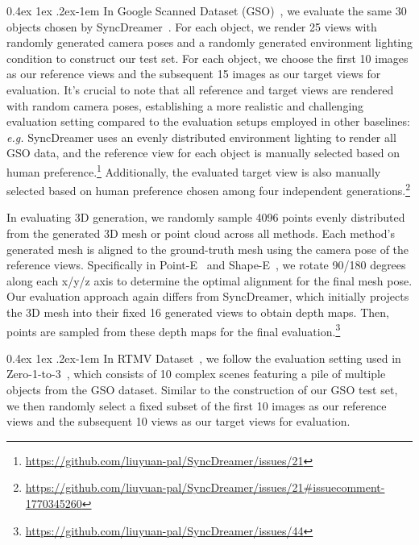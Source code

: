 \documentclass[10pt,twocolumn,letterpaper]{article}
\makeatletter
\renewcommand{\paragraph}{%
  \@startsection{paragraph}{4}%
  {\z@}{0.4ex \@plus 1ex \@minus .2ex}{-1em}%
  {\normalfont\normalsize\bfseries}%
}
\makeatother
\begin{document}
\paragraph{In Google Scanned Dataset (GSO)~\cite{downs2022google},} we evaluate the same 30 objects chosen by SyncDreamer~\cite{liu2023syncdreamer}. For each object, we render 25 views with randomly generated camera poses and a randomly generated environment lighting condition to construct our test set. For each object, we choose the first 10 images as our reference views and the subsequent 15 images as our target views for evaluation. It's crucial to note that all reference and target views are rendered with random camera poses, establishing a more realistic and challenging evaluation setting compared to the evaluation setups employed in other baselines: {\it e.g.} SyncDreamer uses an evenly distributed environment lighting to render all GSO data, and the reference view for each object is manually selected based on human preference.\footnote{\url{https://github.com/liuyuan-pal/SyncDreamer/issues/21}} Additionally, the evaluated target view is also manually selected based on human preference chosen among four independent generations.\footnote{\url{https://github.com/liuyuan-pal/SyncDreamer/issues/21\#issuecomment-1770345260}}

In evaluating 3D generation, we randomly sample 4096 points evenly distributed from the generated 3D mesh or point cloud across all methods. Each method's generated mesh is aligned to the ground-truth mesh using the camera pose of the reference views. Specifically in Point-E~\cite{nichol2022pointe} and Shape-E~\cite{jun2023shape}, we rotate 90/180 degrees along each x/y/z axis to determine the optimal alignment for the final mesh pose. Our evaluation approach again differs from SyncDreamer, which initially projects the 3D mesh into their fixed 16 generated views to obtain depth maps. Then, points are sampled from these depth maps for the final evaluation.\footnote{\url{https://github.com/liuyuan-pal/SyncDreamer/issues/44}}

\paragraph{In RTMV Dataset~\cite{tremblay2022rtmv},} we follow the evaluation setting used in Zero-1-to-3~\cite{liu2023zero}, which consists of 10 complex scenes featuring a pile of multiple objects from the GSO dataset. Similar to the construction of our GSO test set, we then randomly select a fixed subset of the first 10 images as our reference views and the subsequent 10 views as our target views for evaluation.
\end{document}
